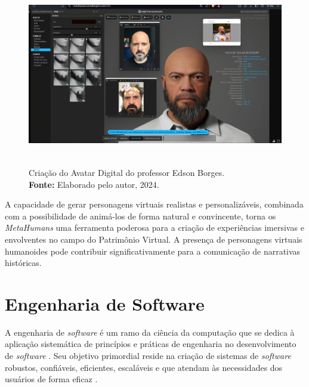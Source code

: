 {    \begin{figure}[H]
        \centering
        \includegraphics[height=8cm, keepaspectratio]{img/Metahuman.png}
        \caption{Criação do Avatar Digital do professor Edson Borges. \\
            \textbf{Fonte:} Elaborado pelo autor, 2024.}
        \label{fig:metahumanEdson}
    \end{figure}
    
    
    
    A capacidade de gerar personagens virtuais realistas e personalizáveis, combinada com a possibilidade de animá-los de forma natural e convincente, torna os \textit{MetaHumans} uma ferramenta poderosa para a criação de experiências imersivas e envolventes no campo do Patrimônio Virtual. A presença de personagens virtuais humanoides pode contribuir significativamente para a comunicação de narrativas históricas.
    
    \section{Engenharia de Software}
    A engenharia de \textit{software} é um ramo da ciência da computação que se dedica à aplicação sistemática de princípios e práticas de engenharia no desenvolvimento de \textit{software} \citep{pressman2021engenharia}. Seu objetivo primordial reside na criação de sistemas de \textit{software} robustos, confiáveis, eficientes, escaláveis e que atendam às necessidades dos usuários de forma eficaz \citep{Sommerville2011}.
    
}
